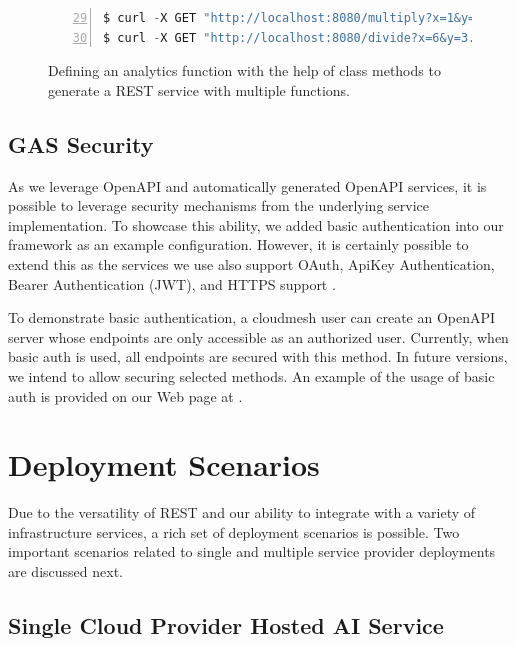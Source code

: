\begin{figure}[htb]
\bigskip

\begin{lstlisting}[language=Python,
                   firstnumber=29,
                   basicstyle=\ttfamily\FONT,
                   numbers=left,                   
                   numbersep=5pt,
                   xleftmargin=5mm]
$ curl -X GET "http://localhost:8080/multiply?x=1&y=2" -H "accept: text/plain"
$ curl -X GET "http://localhost:8080/divide?x=6&y=3.14" -H "accept: text/plain"
\end{lstlisting}

\caption{Defining an analytics function with the help of class methods to generate a REST service with multiple functions.}
\label{fig:class-curl}

\end{figure}


\subsection{GAS Security}

As we leverage OpenAPI and automatically generated OpenAPI services,
it is possible to leverage security mechanisms from the underlying
service implementation. To showcase this ability, we added basic
authentication into our framework as an example
configuration. However, it is certainly possible to extend this as the
services we use also support OAuth, ApiKey Authentication, Bearer
Authentication (JWT), and HTTPS
support \cite{connexion-security}.

To demonstrate basic authentication, a cloudmesh user can create an
OpenAPI server whose endpoints are only accessible as an authorized
user. Currently, when basic auth is used, all endpoints are secured
with this method. In future versions, we intend to allow securing
selected methods.  An example of the usage of basic auth is provided
on our Web page at .

\section{Deployment Scenarios}

Due to the versatility of REST and our ability to integrate with a
variety of infrastructure services, a rich set of deployment scenarios
is possible. Two important scenarios related to single and multiple
service provider deployments are discussed next.

\subsection{Single Cloud Provider Hosted AI Service}

